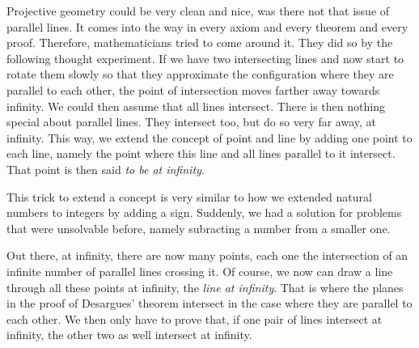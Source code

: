 \documentclass[tikz]{scrreprt}
\begin{document}
\begin{center}
\end{center}

Projective geometry could be very clean and nice, was there not
that issue of parallel lines. It comes into the way in every
axiom and every theorem and every proof. Therefore, mathematicians
tried to come around it. 
They did so by the following thought experiment.
If we have two intersecting lines and now start to
rotate them slowly so that they approximate the configuration
where they are parallel to each other,
the point of intersection moves farther away towards
infinity. We could then assume that all lines intersect.
There is then nothing special about parallel lines.
They intersect too, but do so very far away, \viz
at infinity. This way, we extend the concept
of point and line by adding one point to each line,
namely the point where this line and 
all lines parallel to it
intersect. That point is then said \emph{
to be at infinity}.

This trick to extend a concept is very similar 
to how we extended natural numbers to
integers by adding a sign. Suddenly, we had a solution
for problems that were unsolvable before,
namely subracting a number from a smaller one.

Out there, at infinity, there are now many points,
each one the intersection of an infinite number 
of parallel lines crossing it. Of course, we now
can draw a line through all these points at infinity,
the \emph{line at infinity}. That is where the planes 
in the proof of Desargues' theorem intersect in
the case where they are parallel to each other.
We then only have to prove that, if one pair of
lines intersect at infinity, the other two as well
intersect at infinity.
\end{document}
